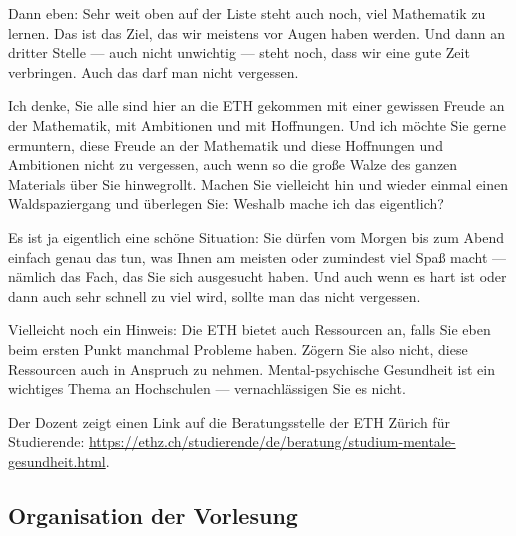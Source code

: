\begin{spoken-clean}[00:01:45 - 00:03:15]
Dann eben: Sehr weit oben auf der Liste steht auch noch, viel Mathematik zu lernen. Das ist das Ziel, das wir meistens vor Augen haben werden. Und dann an dritter Stelle --- auch nicht unwichtig --- steht noch, dass wir eine gute Zeit verbringen. Auch das darf man nicht vergessen. 

Ich denke, Sie alle sind hier an die ETH gekommen mit einer gewissen Freude an der Mathematik, mit Ambitionen und mit Hoffnungen. Und ich möchte Sie gerne ermuntern, diese Freude an der Mathematik und diese Hoffnungen und Ambitionen nicht zu vergessen, auch wenn so die große Walze des ganzen Materials über Sie hinwegrollt. Machen Sie vielleicht hin und wieder einmal einen Waldspaziergang und überlegen Sie: Weshalb mache ich das eigentlich? 

Es ist ja eigentlich eine schöne Situation: Sie dürfen vom Morgen bis zum Abend einfach genau das tun, was Ihnen am meisten oder zumindest viel Spaß macht --- nämlich das Fach, das Sie sich ausgesucht haben. Und auch wenn es hart ist oder dann auch sehr schnell zu viel wird, sollte man das nicht vergessen.

Vielleicht noch ein Hinweis: Die ETH bietet auch Ressourcen an, falls Sie eben beim ersten Punkt manchmal Probleme haben. Zögern Sie also nicht, diese Ressourcen auch in Anspruch zu nehmen. Mental-psychische Gesundheit ist ein wichtiges Thema an Hochschulen --- vernachlässigen Sie es nicht.
\end{spoken-clean}

\begin{meta-note}
Der Dozent zeigt einen Link auf die Beratungsstelle der ETH Zürich für Studierende: \url{https://ethz.ch/studierende/de/beratung/studium-mentale-gesundheit.html}.
\end{meta-note}

\subsection{Organisation der Vorlesung}

